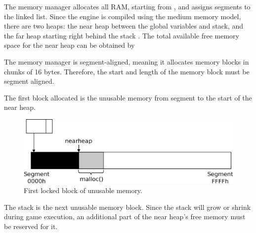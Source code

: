 \documentclass[book.tex]{subfiles}
\begin{document}
\par

\par  
The memory manager allocates all RAM, starting from , and assigns segments to the linked list. Since the engine is compiled using the medium memory model, there are two heaps: the near heap between the global variables and stack, and the far heap starting right behind the stack . The total available free memory space for the near heap can be obtained by\\
\par


\par  
The memory manager is segment-aligned, meaning it allocates memory blocks in chunks of 16 bytes. Therefore, the start and length of the memory block must be segment aligned. \\




\par  
The first block allocated is the unusable memory from segment  to the start of the near heap.\\



\par  

\begin{figure}[H]
\centering
 \includegraphics[width=\textwidth]{imgs/drawings/mm_start.eps}
 \caption{First locked block of unusable memory.}
 \end{figure}
 \par

\par
The stack is the next unusable memory block. Since the stack will grow or shrink during game execution, an additional part of the near heap's free memory must be reserved for it.\\

\par

\par  
\end{document}
